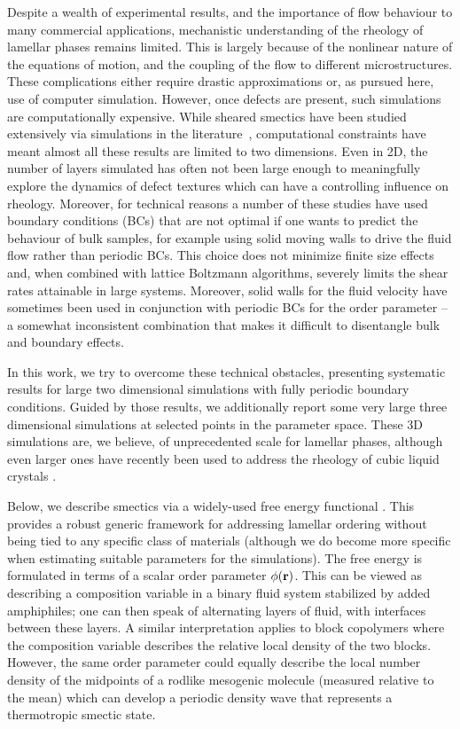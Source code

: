 \documentclass[8.5pt,twoside,twocolumn]{article}
\begin{document}
Despite a wealth of experimental results, and the importance of flow behaviour
to many commercial applications, mechanistic understanding of
the rheology of lamellar phases remains limited. This is largely
because of the nonlinear nature of the equations of motion, and the
coupling of the flow to different microstructures. These complications either require
drastic approximations or, as pursued here, use of computer
simulation. However, once defects are present, such simulations are computationally expensive. 
While sheared smectics have been studied extensively via simulations
in the literature~\cite{Swift96,Gonnella97,Gonnella98,Xu03,Xu05,Xu06a,Xu06b},
computational constraints have meant almost all these results are limited
to two dimensions. Even in 2D, the number of layers simulated has often not been large enough to meaningfully explore the dynamics of defect textures which can have a controlling influence on rheology. Moreover, for technical reasons a number of these studies have used boundary conditions (BCs) that are not optimal if one wants to predict the behaviour of bulk samples, for example using solid moving walls to drive the fluid flow rather than periodic BCs. This choice does not minimize finite size effects and, when combined with lattice Boltzmann algorithms, severely limits the shear rates attainable in large systems. Moreover, solid walls for the fluid velocity have sometimes been used in conjunction with periodic BCs for the order parameter \cite{Xu06b} -- a somewhat inconsistent combination that makes it difficult to disentangle bulk and boundary effects. 

In this work, we try to overcome these technical obstacles, presenting systematic results for large two dimensional simulations with fully periodic boundary conditions.
Guided by those results, we additionally report some very large three dimensional simulations at selected points in the parameter space. These 3D simulations are, we believe, of unprecedented scale for lamellar phases, although even larger ones have recently been used to address the rheology of cubic liquid crystals \cite{Saksena09a, Saksena09b}.

Below, we describe smectics via a widely-used free energy functional \cite{Gompper, Gonnella97, Xu06b, Cencini07}. This provides a robust generic framework for addressing lamellar ordering without being tied to any specific class of materials (although we do become more specific when estimating suitable parameters for the simulations). The free energy is formulated in terms of a scalar order parameter $\phi({\bf r})$. This can be viewed as describing a composition variable in a binary fluid system stabilized by added amphiphiles; one can then speak of alternating layers of fluid, with interfaces between these layers. A similar interpretation applies to block copolymers where the composition variable describes the relative local density of the two blocks. However, the same order parameter could equally describe the local number density of the midpoints of a rodlike mesogenic molecule (measured relative to the mean) which can develop a periodic density wave that represents a thermotropic smectic state.
\end{document}
